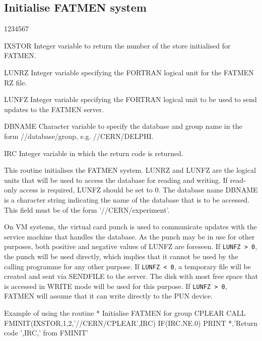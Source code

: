 \subsection{Initialise FATMEN system}
\begin{DLtt}{1234567}
\item[IXSTOR]
Integer variable to return the number of the store initialised
for FATMEN.
\item [LUNRZ]
Integer variable specifying the FORTRAN logical unit for the
FATMEN RZ file.
\item [LUNFZ]
Integer variable specifying the FORTRAN logical unit to be used
to send updates to the FATMEN server.
\item[DBNAME]
Character variable to specify the database and group name
in the form //database/group, e.g. //CERN/DELPHI.
\item[IRC]
Integer variable in which the return code is returned.
\end{DLtt}
\par
This routine initialises the FATMEN system.
LUNRZ and LUNFZ are the logical
units that will be used to access the database for reading and writing.
If read-only access is required, LUNFZ should be set to 0.
The database name DBNAME
is a character string indicating the name of the database that is to be
accessed. This field must be of the form '//CERN/experiment'.
\par
On VM systems, the virtual card punch is used to communicate updates
with the service machine that handles the database.
As the punch may
be in use for other purposes, both positive and negative values of
LUNFZ are foreseen.
If {\tt LUNFZ > 0}, the punch will be used directly,
which implies that it cannot be used by the calling programme for
any other purpose.
If {\tt LUNFZ < 0}, a temporary file will be created and
sent via SENDFILE to the server.
The disk with most free space
that is accessed in WRITE mode will be used for this purpose.
If {\tt LUNFZ > 0}, FATMEN will assume that it can write directly to the
PUN device.
\begin{XMPt}{Example of using the \protect{} routine}
*     Initialise FATMEN for group CPLEAR
      CALL FMINIT(IXSTOR,1,2,'//CERN/CPLEAR',IRC)
      IF(IRC.NE.0) PRINT *,'Return code ',IRC,' from FMINIT'
\end{XMPt}

